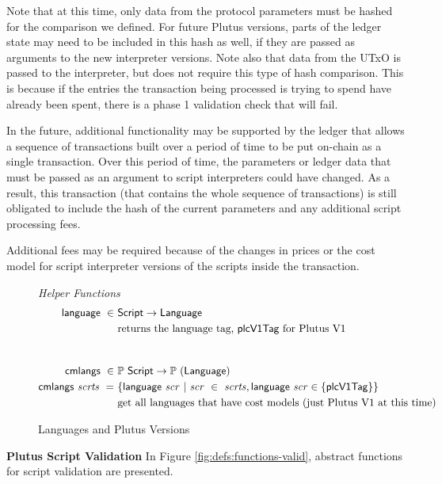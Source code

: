Note that at this time, only data from the protocol parameters must be hashed
for the comparison we defined. For future Plutus versions, parts of the ledger
state may need to be included in this hash as well, if they are passed as
arguments to the new interpreter versions. Note also that data from the UTxO
is passed to the interpreter, but does not require this type of hash comparison.
This is because if the entries the transaction being processed is trying to
spend have already been spent, there is a phase 1 validation check that
will fail.

In the future, additional functionality may be supported by the ledger that
allows a sequence of transactions built over a period of time to be put on-chain
as a single transaction. Over this period of time, the parameters or ledger
data that must be passed as an argument to script interpreters could have changed.
As a result, this transaction (that contains the whole sequence of
transactions) is still obligated to include the hash of the current parameters
and any additional script processing fees.

Additional fees may be required because of the changes in prices or the cost model
for script interpreter versions of the scripts inside the transaction.

\begin{figure*}[htb]
  \emph{Helper Functions}
  \begin{align*}
    \fun{language} ~\in~& \Script \to \Language \\
    &\text{returns the language tag, $\mathsf{plcV1Tag}$ for Plutus V1} \\
    \nextdef
    \fun{cmlangs} ~\in~& \powerset{\Script} \to \powerset{(\Language)} \\
    \fun{cmlangs}~ \var{scrts} ~=~ & \{ \fun{language}~\var{scr} ~\vert~
      \var{scr}~\in~ \var{scrts}, \fun{language}~\var{scr} \in \{\mathsf{plcV1Tag} \}  \}\\
    &\text{get all languages that have cost models (just Plutus V1 at this time)} \\
  \end{align*}
  \caption{Languages and Plutus Versions}
  \label{fig:defs:functions-chain-helper}
\end{figure*}

\textbf{Plutus Script Validation}
In Figure \ref{fig:defs:functions-valid}, abstract functions for script validation
are presented.


